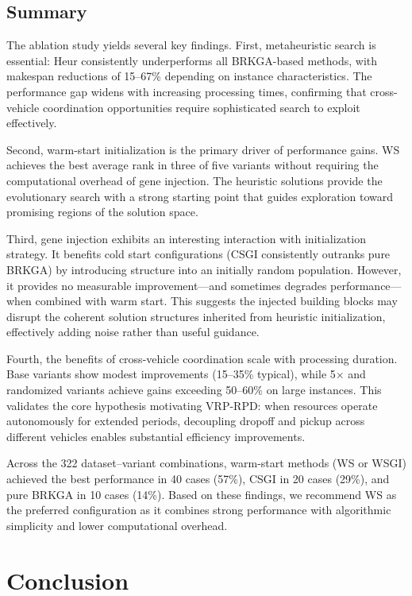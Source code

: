 \documentclass[sigconf]{acmart}
\begin{document}
\subsection{Summary}

The ablation study yields several key findings. First, metaheuristic search is essential: Heur consistently underperforms all BRKGA-based methods, with makespan reductions of 15--67\% depending on instance characteristics. The performance gap widens with increasing processing times, confirming that cross-vehicle coordination opportunities require sophisticated search to exploit effectively.

Second, warm-start initialization is the primary driver of performance gains. WS achieves the best average rank in three of five variants without requiring the computational overhead of gene injection. The heuristic solutions provide the evolutionary search with a strong starting point that guides exploration toward promising regions of the solution space.

Third, gene injection exhibits an interesting interaction with initialization strategy. It benefits cold start configurations (CSGI consistently outranks pure BRKGA) by introducing structure into an initially random population. However, it provides no measurable improvement---and sometimes degrades performance---when combined with warm start. This suggests the injected building blocks may disrupt the coherent solution structures inherited from heuristic initialization, effectively adding noise rather than useful guidance.

Fourth, the benefits of cross-vehicle coordination scale with processing duration. Base variants show modest improvements (15--35\% typical), while 5$\times$ and randomized variants achieve gains exceeding 50--60\% on large instances. This validates the core hypothesis motivating VRP-RPD: when resources operate autonomously for extended periods, decoupling dropoff and pickup across different vehicles enables substantial efficiency improvements.

Across the 322 dataset--variant combinations, warm-start methods (WS or WSGI) achieved the best performance in 40 cases (57\%), CSGI in 20 cases (29\%), and pure BRKGA in 10 cases (14\%). Based on these findings, we recommend WS as the preferred configuration as it combines strong performance with algorithmic simplicity and lower computational overhead.

\section{Conclusion}
\label{sec:conclusion}
\end{document}

